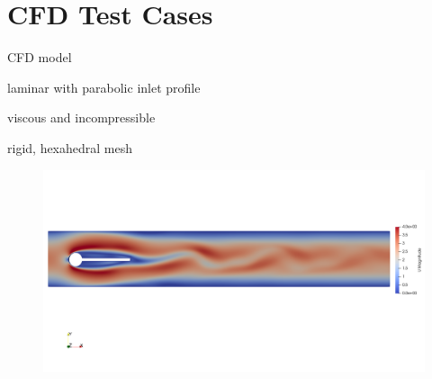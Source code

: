 \documentclass[10pt,t]{beamer}
\begin{document}
\section{CFD Test Cases}


\begin{frame}{CFD model}


  \vspace{0.5cm}
  \begin{description}
  \itemsep 10pt

  \item[flow regime] \textcolor{dblue}{laminar}  with \textcolor{dorange}{parabolic} inlet profile\\
  \item[fluid properties] \textcolor{dblue}{viscous} and \textcolor{dorange}{incompressible}\\
  \item[fluid domain] \textcolor{dblue}{rigid}, \textcolor{dorange}{hexahedral mesh}
  \end{description}    


\begin{figure}
    \centering
    \includegraphics[width=\linewidth, trim=0 270 0 200, clip]{images/CFD3.png}
    \label{fig:my_label}
\end{figure}


\end{frame}
\end{document}
